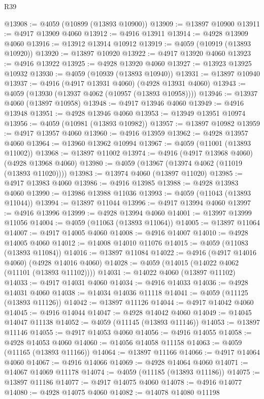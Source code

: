 \begin{lexlean}{R39}
\begin{coremodule}
@13908 := @4059 (@10899 (@13893 @10900))
@13909 := @13897 @10900
@13911 := @4917 @13909 @4060
@13912 := @4916 @13911
@13914 := @4928 @13909 @4060
@13916 := @13912 @13914 @10912
@13919 := @4059 (@10919 (@13893 @10920))
@13920 := @13897 @10920
@13922 := @4917 @13920 @4060
@13923 := @4916 @13922
@13925 := @4928 @13920 @4060
@13927 := @13923 @13925 @10932
@13930 := @4059 (@10939 (@13893 @10940))
@13931 := @13897 @10940
@13937 := @4916 (@4917 @13931 @4060) (@4928 @13931 @4060)
@13943 := @4059 (@13930 (@13937 @4062 (@10957 (@13893 @10958))))
@13946 := @13937 @4060 (@13897 @10958)
@13948 := @4917 @13946 @4060
@13949 := @4916 @13948
@13951 := @4928 @13946 @4060
@13953 := @13949 @13951 @10974
@13956 := @4059 (@10981 (@13893 @10982))
@13957 := @13897 @10982
@13959 := @4917 @13957 @4060
@13960 := @4916 @13959
@13962 := @4928 @13957 @4060
@13964 := @13960 @13962 @10994
@13967 := @4059 (@11001 (@13893 @11002))
@13968 := @13897 @11002
@13974 := @4916 (@4917 @13968 @4060) (@4928 @13968 @4060)
@13980 := @4059 (@13967 (@13974 @4062 (@11019 (@13893 @11020))))
@13983 := @13974 @4060 (@13897 @11020)
@13985 := @4917 @13983 @4060
@13986 := @4916 @13985
@13988 := @4928 @13983 @4060
@13990 := @13986 @13988 @11036
@13993 := @4059 (@11043 (@13893 @11044))
@13994 := @13897 @11044
@13996 := @4917 @13994 @4060
@13997 := @4916 @13996
@13999 := @4928 @13994 @4060
@14001 := @13997 @13999 @11056
@14004 := @4059 (@11063 (@13893 @11064))
@14005 := @13897 @11064
@14007 := @4917 @14005 @4060
@14008 := @4916 @14007
@14010 := @4928 @14005 @4060
@14012 := @14008 @14010 @11076
@14015 := @4059 (@11083 (@13893 @11084))
@14016 := @13897 @11084
@14022 := @4916 (@4917 @14016 @4060) (@4928 @14016 @4060)
@14028 := @4059 (@14015 (@14022 @4062 (@11101 (@13893 @11102))))
@14031 := @14022 @4060 (@13897 @11102)
@14033 := @4917 @14031 @4060
@14034 := @4916 @14033
@14036 := @4928 @14031 @4060
@14038 := @14034 @14036 @11118
@14041 := @4059 (@11125 (@13893 @11126))
@14042 := @13897 @11126
@14044 := @4917 @14042 @4060
@14045 := @4916 @14044
@14047 := @4928 @14042 @4060
@14049 := @14045 @14047 @11138
@14052 := @4059 (@11145 (@13893 @11146))
@14053 := @13897 @11146
@14055 := @4917 @14053 @4060
@14056 := @4916 @14055
@14058 := @4928 @14053 @4060
@14060 := @14056 @14058 @11158
@14063 := @4059 (@11165 (@13893 @11166))
@14064 := @13897 @11166
@14066 := @4917 @14064 @4060
@14067 := @4916 @14066
@14069 := @4928 @14064 @4060
@14071 := @14067 @14069 @11178
@14074 := @4059 (@11185 (@13893 @11186))
@14075 := @13897 @11186
@14077 := @4917 @14075 @4060
@14078 := @4916 @14077
@14080 := @4928 @14075 @4060
@14082 := @14078 @14080 @11198

\end{coremodule}
\end{lexlean}
